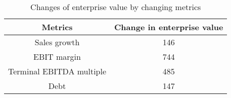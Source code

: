 \begin{table}[ht]
\centering
\begin{tabular}{@{}cc@{}}
\toprule
Metrics                  & Change in enterprise value \\ \midrule
Sales growth             & 146                        \\
EBIT margin              & 744                        \\
Terminal EBITDA multiple & 485                        \\
Debt                     & 147                        \\ \bottomrule
\end{tabular}
\caption{Changes of enterprise value by changing metrics}
\label{tab:prob4-changes}
\end{table}
